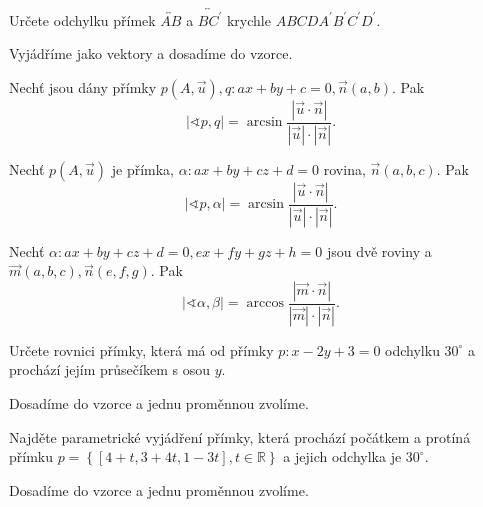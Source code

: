 \begin{priklad}
Určete odchylku přímek $\overleftrightarrow{AB}$ a $\overleftrightarrow{BC^\prime}$
krychle $ABCDA^\prime B^\prime C^\prime D^\prime$.
\end{priklad}

\begin{reseni}
Vyjádříme jako vektory a dosadíme do vzorce.
\end{reseni}

\begin{veta}
Nechť jsou dány přímky $p(A,\vec u), q:ax+by+c=0, \vec n(a,b).$ Pak
$$|\sphericalangle p, q|=\arcsin \frac{|\vec u \cdot \vec n|}{|\vec u|\cdot |\vec n|}.$$
\end{veta}

\begin{veta}
    Nechť $p(A,\vec u)$ je přímka, $\alpha:ax+by+cz+d=0$ rovina, $\vec n(a,b,c)$. Pak
    $$|\sphericalangle p, \alpha|=\arcsin \frac{|\vec u \cdot \vec n|}{|\vec u|\cdot |\vec n|}.$$
\end{veta}

\begin{veta}
    Nechť $\alpha:ax+by+cz+d=0, ex+fy+gz+h=0$ jsou dvě roviny a $\vec m(a,b,c), \vec n(e,f,g).$
    Pak
    $$|\sphericalangle \alpha, \beta|=\arccos \frac{|\vec m \cdot \vec n|}{|\vec m|\cdot |\vec n|}.$$
\end{veta}

\begin{priklad}
Určete rovnici přímky, která má od přímky $p:x-2y+3=0$ odchylku $30^\circ$ a prochází
jejím průsečíkem s osou $y$.
\end{priklad}

\begin{reseni}
Dosadíme do vzorce a jednu proměnnou zvolíme.
\end{reseni}

\begin{priklad}
Najděte parametrické vyjádření přímky, která prochází počátkem a protíná přímku $p=\left \{ [4+t,3+4t,1-3t],t\in \mathbb R \right \} $
a jejich odchylka je $30^\circ$.
\end{priklad}

\begin{reseni}
Dosadíme do vzorce a jednu proměnnou zvolíme.
\end{reseni}
